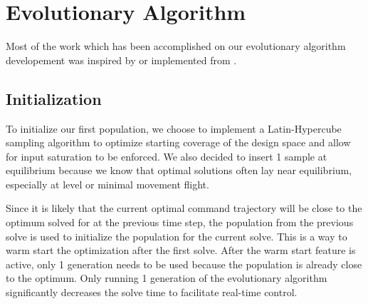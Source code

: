 \documentclass[letterpaper, 10 pt, conference]{ieeeconf}  %
\begin{document}
	
	
	\section{Evolutionary Algorithm}
	
	Most of the work which has been accomplished on our evolutionary algorithm developement was inspired by or implemented from \cite{martins2017multidisciplinary}.
	
	\subsection{Initialization}
	
	To initialize our first population, we choose to implement a Latin-Hypercube sampling algorithm to optimize starting coverage of the design space and allow for input saturation to be enforced. We also decided to insert 1 sample at equilibrium because we know that optimal solutions often lay near equilibrium, especially at level or minimal movement flight.
	
	Since it is likely that the current optimal command trajectory will be close to the optimum solved for at the previous time step, the population from the previous solve is used to initialize the population for the current solve. This is a way to warm start the optimization after the first solve. After the warm start feature is active, only 1 generation needs to be used because the population is already close to the optimum. Only running 1 generation of the evolutionary algorithm significantly decreases the solve time to facilitate real-time control.
	
	
	
	
	
\end{document}
